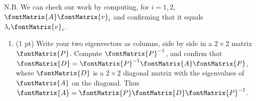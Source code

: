 {N.B. We can check our work by computing, for $i = 1,2$, $\fontMatrix{A} \fontMatrix{v}_{i}$ and confirming that it equals $\lambda_{i} \fontMatrix{v}_{i}$.}%



\begin{enumerate}[resume,label=(\alph*)]
\item\label{itm : Quiz16 b} (1 pt) Write your two eigenvectors as columns, side by side in a $2 \times 2$ matrix $\fontMatrix{P}$. Compute $\fontMatrix{P}^{-1}$, and confirm that $\fontMatrix{D} = \fontMatrix{P}^{-1} \fontMatrix{A} \fontMatrix{P}$, where $\fontMatrix{D}$ is a $2 \times 2$ diagonal matrix with the eigenvalues of $\fontMatrix{A}$ on the diagonal. Thus $\fontMatrix{A} = \fontMatrix{P} \fontMatrix{D} \fontMatrix{P}^{-1}$.
\end{enumerate}

